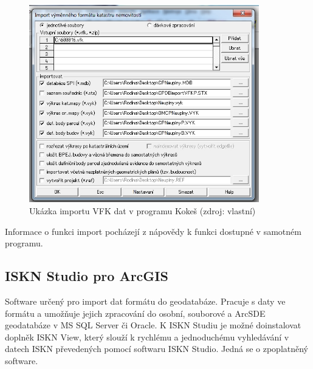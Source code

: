 \begin{figure}[H]
	 \centering
      \includegraphics[width=10cm]{./pictures/kokes.png}
      \caption{Ukázka importu VFK dat v programu Kokeš (zdroj: vlastní)}
      \label{fig:kokes}
  \end{figure}
  
Informace o funkci import  pocházejí z nápovědy k funkci dostupné v samotném programu.
\subsection{ISKN Studio pro ArcGIS}
Software určený pro import dat formátu  do
geodatabáze. Pracuje s daty ve formátu  a umožňuje jejich
zpracování do osobní, souborové a ArcSDE geodatabáze v MS SQL Server
či Oracle. K ISKN Studiu je možné doinstalovat doplněk ISKN View,
který slouží k rychlému a jednoduchému vyhledávání v datech ISKN
převedených pomocí softwaru ISKN Studio. Jedná se o zpoplatněný
software. \cite{arcgis}

